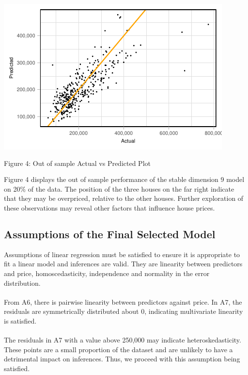 \documentclass[letterpaper,9pt,twocolumn,twoside,]{pinp}
\begin{document}
\begin{center}\includegraphics{Report_files/figure-latex/unnamed-chunk-14-1} \end{center}
\vspace{-10pt}
\centerline{\small Figure 4: Out of sample Actual vs Predicted Plot}

\hfill\break
\noindent Figure 4 displays the out of sample performance of the stable
dimension 9 model on 20\% of the data. The position of the three houses
on the far right indicate that they may be overpriced, relative to the
other houses. Further exploration of these observations may reveal other
factors that influence house prices.

\hypertarget{assumptions-of-the-final-selected-model}{%
\subsection{Assumptions of the Final Selected
Model}\label{assumptions-of-the-final-selected-model}}

\hfill\break
Assumptions of linear regression must be satisfied to ensure it is
appropriate to fit a linear model and inferences are valid. They are
linearity between predictors and price, homoscedasticity, independence
and normality in the error distribution.\\
~\\
\noindent From A6, there is pairwise linearity between predictors
against price. In A7, the residuals are symmetrically distributed about
0, indicating multivariate linearity is satisfied.\\
~\\
\noindent The residuals in A7 with a value above 250,000 may indicate
heteroskedasticity. These points are a small proportion of the dataset
and are unlikely to have a detrimental impact on inferences. Thus, we
proceed with this assumption being satisfied.\\
\end{document}
